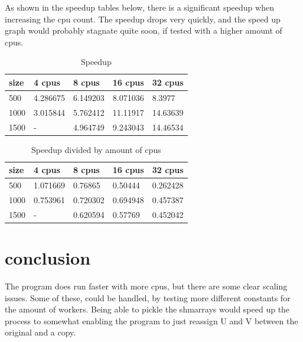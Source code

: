\documentclass{Article}
\begin{document}
As shown in the speedup tables below, there is a significant speedup when increasing the cpu count. The speedup drops very quickly, and the speed up graph would probably stagnate quite soon, if tested with a higher amount of cpus.
\begin{table}[h!]
\centering
\caption{Speedup}
\label{my-label}
\begin{tabular}{|l|l|l|l|l|}
\hline
size & 4 cpus   & 8 cpus   & 16 cpus  & 32 cpus  \\ \hline
500  & 4.286675 & 6.149203 & 8.071036 & 8.3977   \\ \hline
1000 & 3.015844 & 5.762412 & 11.11917 & 14.63639 \\ \hline
1500 & -        & 4.964749 & 9.243043 & 14.46534 \\ \hline
\end{tabular}
\end{table}
\begin{table}[h!]
\centering
\caption{Speedup divided by amount of cpus}
\label{my-label}
\begin{tabular}{|l|l|l|l|l|}
\hline
size & 4 cpus   & 8 cpus   & 16 cpus  & 32 cpus  \\ \hline
500  & 1.071669 & 0.76865  & 0.50444  & 0.262428 \\ \hline
1000 & 0.753961 & 0.720302 & 0.694948 & 0.457387 \\ \hline
1500 & -        & 0.620594 & 0.57769  & 0.452042 \\ \hline
\end{tabular}
\end{table}
\section{conclusion}
The program does run faster with more cpus, but there are some clear scaling issues. Some of these, could be handled, by testing more different constants for the amount of workers. Being able to pickle the shmarrays would speed up the process to somewhat enabling the program to just reassign U and V between the original and a copy.
\end{document}
